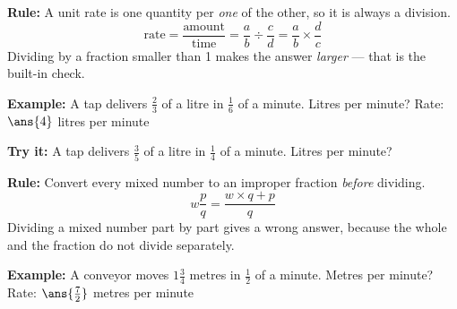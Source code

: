 \documentclass[12pt]{article}
\begin{document}


\begin{formulabox}
\textbf{Rule:} A unit rate is one quantity per \emph{one} of the other, so it is always a division.
\[ \text{rate} = \frac{\text{amount}}{\text{time}} = \frac{a}{b} \div \frac{c}{d} = \frac{a}{b} \times \frac{d}{c} \]
Dividing by a fraction smaller than 1 makes the answer \emph{larger} --- that is the built-in check.
\end{formulabox}

\begin{examplebox}
\textbf{Example:} \quad A tap delivers $\frac{2}{3}$ of a litre in $\frac{1}{6}$ of a minute. Litres per minute?
Rate: $\ans{4}$ litres per minute
\end{examplebox}

\begin{tryitbox}
\textbf{Try it:} \quad A tap delivers $\frac{3}{5}$ of a litre in $\frac{1}{4}$ of a minute. Litres per minute?\\[2pt]
\end{tryitbox}


\begin{formulabox}
\textbf{Rule:} Convert every mixed number to an improper fraction \emph{before} dividing.
\[ w\frac{p}{q} = \frac{w \times q + p}{q} \]
Dividing a mixed number part by part gives a wrong answer, because the whole and the fraction do not divide separately.
\end{formulabox}

\begin{examplebox}
\textbf{Example:} \quad A conveyor moves $1\frac{3}{4}$ metres in $\frac{1}{2}$ of a minute. Metres per minute?
Rate: $\ans{\tfrac{7}{2}}$ metres per minute
\end{examplebox}
\end{document}
